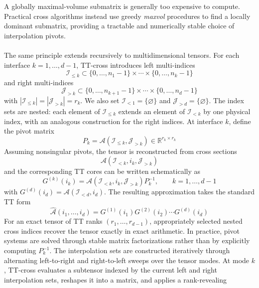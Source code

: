 \documentclass{article}
\numberwithin{equation}{subsection}
\theoremstyle{definition}
\theoremstyle{remark}
\begin{document}
A globally maximal-volume submatrix is generally too expensive to compute.
Practical cross algorithms instead use greedy \emph{maxvol} procedures to find
a locally dominant submatrix, providing a tractable and numerically stable
choice of interpolation pivots.\\
\\
The same principle extends recursively to multidimensional tensors. For each
interface $k=1,\ldots,d-1$, TT-cross introduces left multi-indices
\[
\mathcal{I}_{\leq k}
\subset
\{0,\ldots,n_1-1\}
\times\cdots\times
\{0,\ldots,n_k-1\}
\]
and right multi-indices
\[
\mathcal{J}_{>k}
\subset
\{0,\ldots,n_{k+1}-1\}
\times\cdots\times
\{0,\ldots,n_d-1\}
\]
with $\left| \mathcal{I}_{\leq k} \right| = \left| \mathcal{J}_{>k} \right| = r_k$. We also set $\mathcal{I}_{<1}=\{\varnothing\}$ and $\mathcal{J}_{>d}=\{\varnothing\}$. The index sets are nested: each element of $\mathcal{I}_{\leq k}$ extends an element of $\mathcal{I}_{<k}$ by one physical index, with an analogous construction for the right indices. At interface $k$, define the pivot matrix
\begin{equation}
P_k = \mathcal{A} \left( \mathcal{I}_{\leq k}, \mathcal{J}_{>k} \right) \in \mathbb{R}^{r_k\times r_k}
\end{equation}
Assuming nonsingular pivots, the tensor is reconstructed from cross sections
\[
\mathcal{A}
\left(
\mathcal{I}_{<k},
i_k,
\mathcal{J}_{>k}
\right)
\]
and the corresponding TT cores can be written schematically as
\begin{equation}
G^{(k)}(i_k) = \mathcal{A} \left( \mathcal{I}_{<k}, i_k, \mathcal{J}_{>k} \right) P_k^{-1}, \qquad k=1,\ldots,d-1
\end{equation}
with $G^{(d)}(i_d) = \mathcal{A} \left( \mathcal{I}_{<d}, i_d \right)$. The resulting approximation takes the standard TT form
\begin{equation}
\widehat{\mathcal{A}}(i_1,\ldots,i_d) = G^{(1)}(i_1) G^{(2)}(i_2) \cdots G^{(d)}(i_d)
\end{equation}
For an exact tensor of TT ranks $(r_1,\ldots,r_{d-1})$, appropriately selected
nested cross indices recover the tensor exactly in exact arithmetic. In
practice, pivot systems are solved through stable matrix factorizations rather
than by explicitly computing $P_k^{-1}$.
The interpolation sets are constructed iteratively through alternating
left-to-right and right-to-left sweeps over the tensor modes. At mode \(k\),
TT-cross evaluates a subtensor indexed by the current left and right
interpolation sets, reshapes it into a matrix, and applies a rank-revealing
\end{document}
